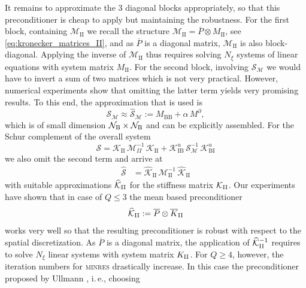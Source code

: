 \documentclass[a4paper,10pt]{article}
\newcommand{\cK}{{\mathcal{K}}}
\newcommand{\cM}{{\mathcal{M}}}
\newcommand{\N}{{\mathcal{N}}}
\numberwithin{theorem}{section}
\begin{document}
It remains to approximate the 3 diagonal blocks appropriately, so that this preconditioner is cheap to apply but maintaining the robustness. For the first block, containing $\cM_{\text{II}}$ we recall the structure $\cM_{\text{II}} = \overline P \otimes M_{\text{II}}$, see \eqref{eq:kronecker_matrices_II}, and as $\overline P$ is a diagonal matrix, $\cM_{\text{II}}$ is also block-diagonal. Applying the inverse of $\cM_{\text{II}}$ thus requires solving $N_{\xi}$ systems of linear equations with system matrix $M_{\text{II}}$. For the second block, involving $\mathcal S_{\cM}$ we would have to invert a sum of two matrices which is not very practical. However, numerical experiments show that omitting the latter term yields very promising results. To this end, the approximation that is used is
\begin{equation*}
  \mathcal S_{\cM} \approx \widehat{\mathcal{S}}_{\cM} := M_{\text{BB}} + \alpha\,M^\partial,
\end{equation*}
which is of small dimension $\N_{\textup{B}}\times \N_{\textup{B}}$ and can be explicitly assembled. For the Schur complement of the overall system
\begin{equation*}
	\mathcal S= \cK_{\text{II}}\,\cM_{II}^{-1}\,\cK_{\text{II}} + \cK_{\text{IB}}^u \,\mathcal S_{\cM}^{-1}\,\cK_{\text{BI}}^u
\end{equation*}
 we also omit the second term and arrive at
\begin{align*}
  \widehat{\mathcal S} &= \widehat{\cK}_{\text{II}}\,\cM_{\text{II}}^{-1}\,\widehat{\cK}_{\text{II}}
\end{align*}
with suitable approximations $\widehat \cK_{\textup{II}}$ for the stiffness matrix $\cK_{\textup{II}}$. Our experiments have shown that in case of $Q\le 3$ the mean based preconditioner
\begin{equation*}
	\widehat \cK_{\textup{II}} := \overline P\otimes \overline K_{\textup{II}}
\end{equation*}
works very well so that the resulting preconditioner is robust with respect to the spatial discretization. As $\overline P$ is a diagonal matrix, the application of $\widehat \cK_{\textup{II}}^{-1}$ requires to solve $N_\xi$ linear systems with system matrix $K_{\textup{II}}$.
For $Q\ge 4$, however, the iteration numbers for \textsc{minres} drastically increase. In this case the preconditioner proposed by Ullmann \cite{EUllmann_2010}, i.\,e., choosing
\end{document}
